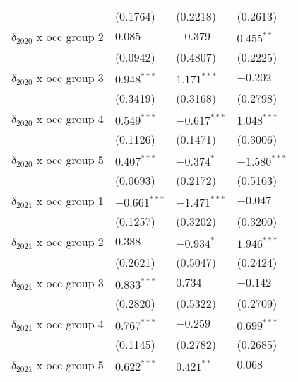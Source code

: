 \begin{tabular}{llll}
                                       &           (0.1764) &           (0.2218) &           (0.2613) \\
$\delta_{2020}$ x occ group 2          &            $0.085$ &           $-0.379$ &       $0.455^{**}$ \\
                                       &           (0.0942) &           (0.4807) &           (0.2225) \\
$\delta_{2020}$ x occ group 3          &      $0.948^{***}$ &      $1.171^{***}$ &           $-0.202$ \\
                                       &           (0.3419) &           (0.3168) &           (0.2798) \\
$\delta_{2020}$ x occ group 4          &      $0.549^{***}$ &     $-0.617^{***}$ &      $1.048^{***}$ \\
                                       &           (0.1126) &           (0.1471) &           (0.3006) \\
$\delta_{2020}$ x occ group 5          &      $0.407^{***}$ &         $-0.374^*$ &     $-1.580^{***}$ \\
                                       &           (0.0693) &           (0.2172) &           (0.5163) \\
$\delta_{2021}$ x occ group 1          &     $-0.661^{***}$ &     $-1.471^{***}$ &           $-0.047$ \\
                                       &           (0.1257) &           (0.3202) &           (0.3200) \\
$\delta_{2021}$ x occ group 2          &            $0.388$ &         $-0.934^*$ &      $1.946^{***}$ \\
                                       &           (0.2621) &           (0.5047) &           (0.2424) \\
$\delta_{2021}$ x occ group 3          &      $0.833^{***}$ &            $0.734$ &           $-0.142$ \\
                                       &           (0.2820) &           (0.5322) &           (0.2709) \\
$\delta_{2021}$ x occ group 4          &      $0.767^{***}$ &           $-0.259$ &      $0.699^{***}$ \\
                                       &           (0.1145) &           (0.2782) &           (0.2685) \\
$\delta_{2021}$ x occ group 5          &      $0.622^{***}$ &       $0.421^{**}$ &            $0.068$ \\

\end{tabular}
